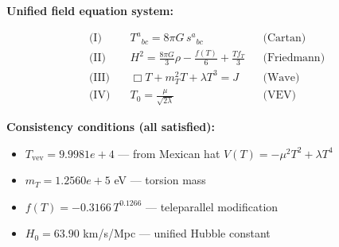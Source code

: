 
\textbf{Unified field equation system:}

\begin{align}
  \text{(I)} \quad & T^a{}_{bc} = 8\pi G \, s^a{}_{bc} && \text{(Cartan)} \\
  \text{(II)} \quad & H^2 = \frac{8\pi G}{3}\rho - \frac{f(T)}{6} + \frac{Tf_T}{3} && \text{(Friedmann)} \\
  \text{(III)} \quad & \Box T + m_T^2 T + \lambda T^3 = J && \text{(Wave)} \\
  \text{(IV)} \quad & T_0 = \frac{\mu}{\sqrt{2\lambda}} && \text{(VEV)}
\end{align}

\textbf{Consistency conditions (all satisfied):}
\begin{itemize}
  \item $T_{\text{vev}} = 9.9981e+4$ — from Mexican hat $V(T) = -\mu^2 T^2 + \lambda T^4$
  \item $m_T = 1.2560e+5$ eV — torsion mass
  \item $f(T) = -0.3166 \, T^{0.1266}$ — teleparallel modification
  \item $H_0 = 63.90$ km/s/Mpc — unified Hubble constant
\end{itemize}